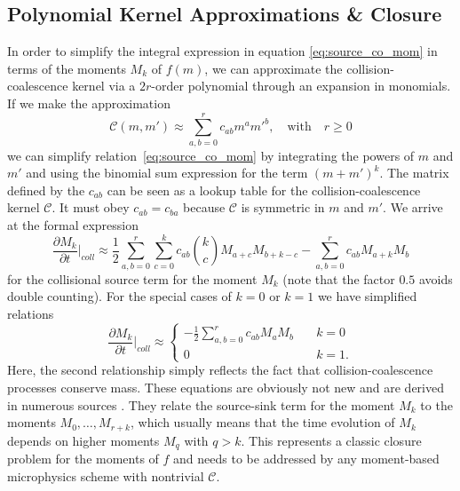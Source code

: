 \documentclass{report}
\begin{document}
\subsection{Polynomial Kernel Approximations \& Closure}
In order to simplify the integral expression in equation \eqref{eq:source_co_mom} in terms of the moments $M_k$ of $f(m)$, we can approximate the collision-coalescence kernel via a $2r$-order polynomial through an expansion in monomials. If we make the approximation
\begin{equation}
    \mathcal{C}(m,m') \approx \sum_{a,b=0}^{r} c_{ab} m^a{m'}^b, \quad \text{with} \quad r \geq 0
\label{eq:dist_approx}
\end{equation} 
we can simplify relation~\eqref{eq:source_co_mom} by integrating the powers of $m$ and $m'$ and using the binomial sum expression for the term $(m+m')^k$. The matrix defined by the $c_{ab}$ can be seen as a lookup table for the collision-coalescence kernel $\mathcal{C}$. It must obey $c_{ab} = c_{ba}$ because $\mathcal{C}$ is symmetric in $m$ and $m'$. We arrive at the formal expression
\begin{equation}
\frac{\partial M_k}{\partial t} \biggr\rvert_{coll} \approx
    \frac{1}{2} \sum_{a,b=0}^{r} \sum_{c=0}^k c_{ab} {k \choose c} M_{a+c} M_{b+k-c} - \sum_{a,b=0}^{r} c_{ab} M_{a+k} M_b
\label{eq:source_co_mom_approx}
\end{equation}
for the collisional source term for the moment $M_k$ (note that the factor $0.5$ avoids double counting). For the special cases of $k=0$ or $k=1$ we have simplified relations
\begin{equation}
    \frac{\partial M_k}{\partial t} \biggr\rvert_{coll} \approx
    \begin{cases}
    -\frac{1}{2} \sum_{a,b=0}^{r} c_{ab} M_a M_b & \quad k=0\\
    0 & \quad k = 1.
    \end{cases}
\end{equation}
Here, the second relationship simply reflects the fact that collision-coalescence processes conserve mass. These equations are obviously not new and are derived in numerous sources \citep[cf.][]{Pruppacher1978, Beheng2010}. They relate the source-sink term for the moment $M_k$ to the moments $M_0, \dots, M_{r+k}$, which usually means that the time evolution of $M_k$ depends on higher moments $M_q$ with $q>k$. This represents a classic closure problem for the moments of $f$ and needs to be addressed by any moment-based microphysics scheme with nontrivial $\mathcal{C}$.
\end{document}
